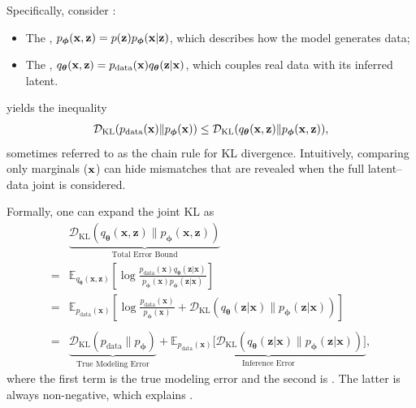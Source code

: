 Specifically, consider :
\begin{itemize}
    \item The , $p_{\bm{\phi}}({\mathbf{x}}, {\mathbf{z}}) = p({\mathbf{z}}) p_{\bm{\phi}}({\mathbf{x}}|{\mathbf{z}})$, which describes how the model generates data;
    \item The , $q_{\bm{\theta}}({\mathbf{x}}, {\mathbf{z}}) = p_{\text{data}}({\mathbf{x}}) q_{\bm{\theta}}({\mathbf{z}}|{\mathbf{x}})$, which couples real data with its inferred latent.
\end{itemize}
 yields the inequality
\begin{align}\label{eq:joint-bound}
    \mathcal{D}_{\mathrm{KL}}(p_{\text{data}}({\mathbf{x}}) \| p_{\bm{\phi}}({\mathbf{x}})) 
    \leq \mathcal{D}_{\mathrm{KL}}(q_{\bm{\theta}}({\mathbf{x}},{\mathbf{z}}) \| p_{\bm{\phi}}({\mathbf{x}},{\mathbf{z}})),
\end{align}
sometimes referred to as the chain rule for KL divergence. 
Intuitively, comparing only marginals (${\mathbf{x}}$) can hide mismatches that are revealed when the full latent–data joint is considered.

Formally, one can expand the joint KL as
\begin{align*}
    &\underbrace{\mathcal{D}_{\mathrm{KL}}(q_{\bm{\theta}}(\mathbf{x}, \mathbf{z}) \| p_{\bm{\phi}}(\mathbf{x}, \mathbf{z}))}_{\text{Total Error Bound}} 
    \\=& \mathbb{E}_{q_{\bm{\theta}}(\mathbf{x}, \mathbf{z})} \left[ \log \frac{p_{\text{data}}(\mathbf{x}) q_{\bm{\theta}}(\mathbf{z}|\mathbf{x})}{p_{\bm{\phi}}(\mathbf{x}) p_{\bm{\phi}}(\mathbf{z}|\mathbf{x})} \right] \\=&\mathbb{E}_{p_{\text{data}}(\mathbf{x})} \left[ \log \frac{p_{\text{data}}(\mathbf{x})}{p_{\bm{\phi}}(\mathbf{x})} + \mathcal{D}_{\mathrm{KL}}\left( q_{\bm{\theta}}(\mathbf{z}|\mathbf{x}) \| p_{\bm{\phi}}(\mathbf{z}|\mathbf{x}) \right) \right] \\
    \\=&  \underbrace{\mathcal{D}_{\mathrm{KL}}(p_{\text{data}} \| p_{\bm{\phi}})}_{\text{True Modeling Error}} + \underbrace{\mathbb{E}_{p_{\text{data}}(\mathbf{x})} \big[ \mathcal{D}_{\mathrm{KL}}( q_{\bm{\theta}}(\mathbf{z}|\mathbf{x}) \| p_{\bm{\phi}}(\mathbf{z}|\mathbf{x}) ) \big]}_{\text{Inference Error}},
\end{align*}
where the first term is the true modeling error and the second is . The latter is always non-negative, which explains .

